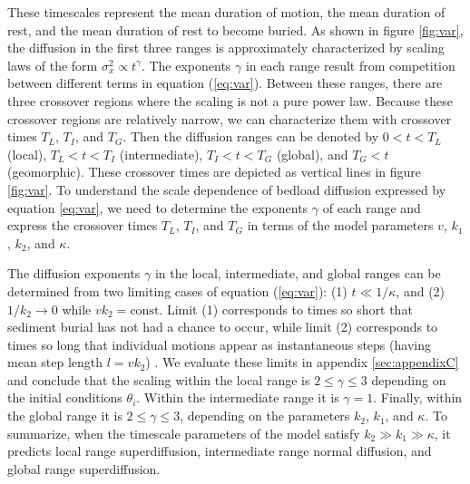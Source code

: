 \documentclass[]{agujournal2018}
\begin{document}
These timescales represent the mean duration of motion, the mean duration of rest, and the mean duration of rest to become buried.
As shown in figure \ref{fig:var}, the diffusion in the first three ranges is approximately characterized by scaling laws of the form $\sigma_x^2 \propto t^\gamma$.
The exponents $\gamma$ in each range result from competition between different terms in equation (\ref{eq:var}).
Between these ranges, there are three crossover regions where the scaling is not a pure power law.
Because these crossover regions are relatively narrow, we can characterize them with crossover times $T_L$, $T_I$, and $T_G$.
Then the diffusion ranges can be denoted by $0< t < T_L$ (local), $T_L < t < T_I$ (intermediate), $T_I < t <T_G$ (global), and $T_G<t$ (geomorphic).
These crossover times are depicted as vertical lines in figure \ref{fig:var}.
To understand the scale dependence of bedload diffusion expressed by equation \ref{eq:var}, we need to determine the exponents $\gamma$ of each range and express the crossover times $T_L$, $T_I$, and $T_G$ in terms of the model parameters $v$, $k_1$, $k_2$, and $\kappa$.

The diffusion exponents $\gamma$ in the local, intermediate, and global ranges can be determined from two limiting cases of equation (\ref{eq:var}): (1) $t\ll 1/\kappa$, and (2) $1/k_2 \rightarrow 0$ while $vk_2 = \text{const}$.
Limit (1) corresponds to times so short that sediment burial has not had a chance to occur, while limit (2) corresponds to times so long that individual motions  appear as instantaneous steps (having mean step length $l=vk_2$) \citep[cf.][]{Einstein1937}.
We evaluate these limits in appendix \ref{sec:appendixC} and conclude that the scaling within the local range is $2 \leq \gamma \leq 3$ depending on the initial conditions $\theta_i$. Within the intermediate range it is $\gamma=1$. Finally, within the global range it is $2 \leq \gamma \leq 3$, depending on the parameters $k_2$, $k_1$, and $\kappa$.
To summarize, when the timescale parameters of the model satisfy $k_2\gg k_1 \gg \kappa$, it predicts local range superdiffusion, intermediate range normal diffusion, and global range superdiffusion.
\end{document}
